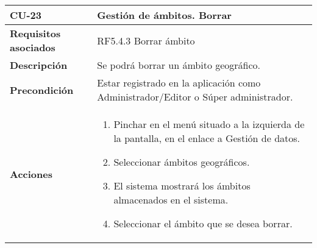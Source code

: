 \newpage
\begin{longtable}[t]{@{}ll@{}}
\toprule
\begin{minipage}[t]{0.23\columnwidth}\raggedright\strut
\textbf{CU-23}\strut
\end{minipage} & \begin{minipage}[b]{0.71\columnwidth}\raggedright\strut
\textbf{Gestión de ámbitos. Borrar}\strut
\end{minipage}\tabularnewline
\midrule
\endhead
\begin{minipage}[t]{0.23\columnwidth}\raggedright\strut
\textbf{Requisitos asociados}\strut
\end{minipage} & \begin{minipage}[t]{0.71\columnwidth}\raggedright\strut
RF5.4.3 Borrar ámbito\strut
\end{minipage}\tabularnewline
\begin{minipage}[t]{0.23\columnwidth}\raggedright\strut
\textbf{Descripción}\strut
\end{minipage} & \begin{minipage}[t]{0.71\columnwidth}\raggedright\strut
Se podrá borrar un ámbito geográfico.
\strut
\end{minipage}\tabularnewline
\begin{minipage}[t]{0.23\columnwidth}\raggedright\strut
\textbf{Precondición}\strut
\end{minipage} & \begin{minipage}[t]{0.71\columnwidth}\raggedright\strut
Estar registrado en la aplicación como Administrador/Editor o Súper administrador.\strut
\end{minipage}\tabularnewline
\begin{minipage}[t]{0.23\columnwidth}\raggedright\strut
\textbf{Acciones}\strut
\end{minipage} & \begin{minipage}[t]{0.71\columnwidth}\raggedright\strut
\begin{enumerate}
\def\labelenumi{\arabic{enumi}.}
\tightlist
\item
Pinchar en el menú situado a la izquierda de la pantalla, en el
enlace a Gestión de datos.
\item
Seleccionar ámbitos geográficos.
\item
El sistema mostrará los ámbitos almacenados en el sistema.
\item
Seleccionar el ámbito que se desea borrar.
\end{enumerate}\strut
\end{minipage}\tabularnewline

\end{longtable}
